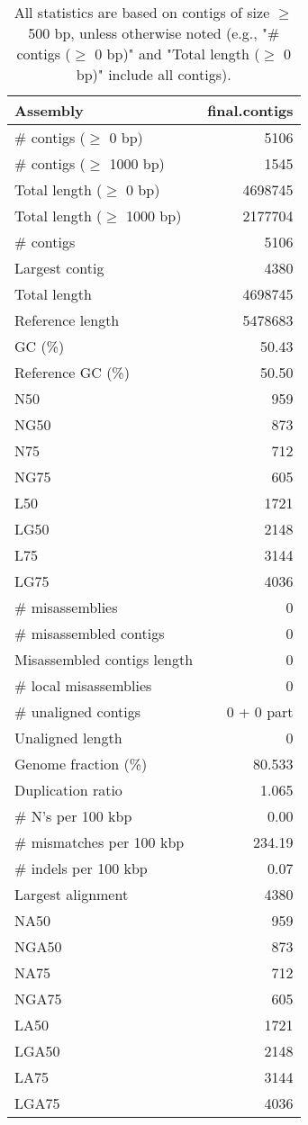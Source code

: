 \documentclass[12pt,a4paper]{article}
\begin{document}
\begin{table}[ht]
\begin{center}
\caption{All statistics are based on contigs of size $\geq$ 500 bp, unless otherwise noted (e.g., "\# contigs ($\geq$ 0 bp)" and "Total length ($\geq$ 0 bp)" include all contigs).}
\begin{tabular}{|l*{1}{|r}|}
\hline
Assembly & final.contigs \\ \hline
\# contigs ($\geq$ 0 bp) & 5106 \\ \hline
\# contigs ($\geq$ 1000 bp) & 1545 \\ \hline
Total length ($\geq$ 0 bp) & 4698745 \\ \hline
Total length ($\geq$ 1000 bp) & 2177704 \\ \hline
\# contigs & 5106 \\ \hline
Largest contig & 4380 \\ \hline
Total length & 4698745 \\ \hline
Reference length & 5478683 \\ \hline
GC (\%) & 50.43 \\ \hline
Reference GC (\%) & 50.50 \\ \hline
N50 & 959 \\ \hline
NG50 & 873 \\ \hline
N75 & 712 \\ \hline
NG75 & 605 \\ \hline
L50 & 1721 \\ \hline
LG50 & 2148 \\ \hline
L75 & 3144 \\ \hline
LG75 & 4036 \\ \hline
\# misassemblies & 0 \\ \hline
\# misassembled contigs & 0 \\ \hline
Misassembled contigs length & 0 \\ \hline
\# local misassemblies & 0 \\ \hline
\# unaligned contigs & 0 + 0 part \\ \hline
Unaligned length & 0 \\ \hline
Genome fraction (\%) & 80.533 \\ \hline
Duplication ratio & 1.065 \\ \hline
\# N's per 100 kbp & 0.00 \\ \hline
\# mismatches per 100 kbp & 234.19 \\ \hline
\# indels per 100 kbp & 0.07 \\ \hline
Largest alignment & 4380 \\ \hline
NA50 & 959 \\ \hline
NGA50 & 873 \\ \hline
NA75 & 712 \\ \hline
NGA75 & 605 \\ \hline
LA50 & 1721 \\ \hline
LGA50 & 2148 \\ \hline
LA75 & 3144 \\ \hline
LGA75 & 4036 \\ \hline
\end{tabular}
\end{center}
\end{table}
\end{document}

